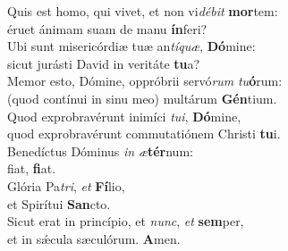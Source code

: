 \oddverse Quis est homo, qui vivet, et non vi\textit{dé}\textit{bit} \textbf{mor}tem:~\*\\
\oddverse éruet ánimam suam de manu \textbf{ín}feri?\\
\evenverse Ubi sunt misericórdiæ tuæ an\textit{tí}\textit{quæ}, \textbf{Dó}mine:~\*\\
\evenverse sicut jurásti David in veritáte \textbf{tu}a?\\
\oddverse Memor esto, Dómine, oppróbrii servó\textit{rum} \textit{tu}\textbf{ó}rum:~\*\\
\oddverse (quod contínui in sinu meo) multárum \textbf{Gén}tium.\\
\evenverse Quod exprobravérunt inimíci \textit{tu}\textit{i}, \textbf{Dó}mine,~\*\\
\evenverse quod exprobravérunt commutatiónem Christi \textbf{tu}i.\\
\oddverse Benedíctus Dóminus \textit{in} \textit{æ}\textbf{tér}num:~\*\\
\oddverse fiat, \textbf{fi}at.\\
\evenverse Glória Pa\textit{tri}, \textit{et} \textbf{Fí}lio,~\*\\
\evenverse et Spirítui \textbf{San}cto.\\
\oddverse Sicut erat in princípio, et \textit{nunc}, \textit{et} \textbf{sem}per,~\*\\
\oddverse et in sǽcula sæculórum. \textbf{A}men.\\
